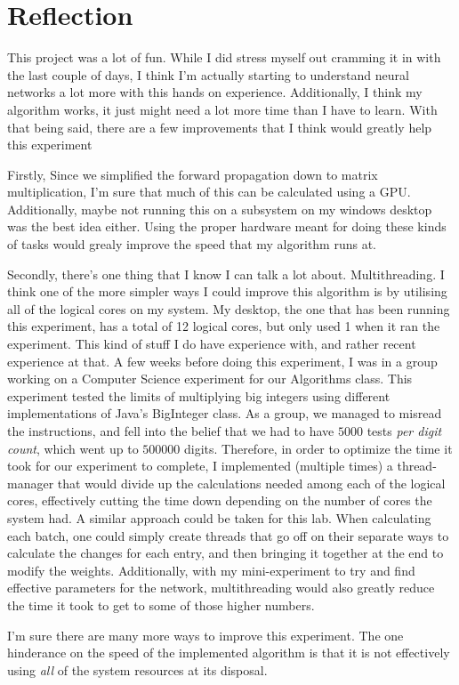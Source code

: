 \documentclass[10pt]{article}
\begin{document}
\section{Reflection}
This project was a lot of fun. While I did stress myself out cramming it in with the last couple of days, I think I'm actually starting to understand neural networks a lot more with this hands on experience. Additionally, I think my algorithm works, it just might need a lot more time than I have to learn. With that being said, there are a few improvements that I think would greatly help this experiment\par
Firstly, Since we simplified the forward propagation down to matrix multiplication, I'm sure that much of this can be calculated using a GPU. Additionally, maybe not running this on a subsystem on my windows desktop was the best idea either. Using the proper hardware meant for doing these kinds of tasks would grealy improve the speed that my algorithm runs at.\par
Secondly, there's one thing that I know I can talk a lot about. Multithreading. I think one of the more simpler ways I could improve this algorithm is by utilising all of the logical cores on my system. My desktop, the one that has been running this experiment, has a total of 12 logical cores, but only used 1 when it ran the experiment. This kind of stuff I do have experience with, and rather recent experience at that.\newline
A few weeks before doing this experiment, I was in a group working on a Computer Science experiment for our Algorithms class. This experiment tested the limits of multiplying big integers using different implementations of Java's BigInteger class. As a group, we managed to misread the instructions, and fell into the belief that we had to have $5000$ tests \textit{per digit count}, which went up to $500000$ digits. Therefore, in order to optimize the time it took for our experiment to complete, I implemented (multiple times) a thread-manager that would divide up the calculations needed among each of the logical cores, effectively cutting the time down depending on the number of cores the system had.\newline
A similar approach could be taken for this lab. When calculating each batch, one could simply create threads that go off on their separate ways to calculate the changes for each entry, and then bringing it together at the end to modify the weights. Additionally, with my mini-experiment to try and find effective parameters for the network, multithreading would also greatly reduce the time it took to get to some of those higher numbers.\par
I'm sure there are many more ways to improve this experiment. The one hinderance on the speed of the implemented algorithm is that it is not effectively using \textit{all} of the system resources at its disposal. 
\end{document}
